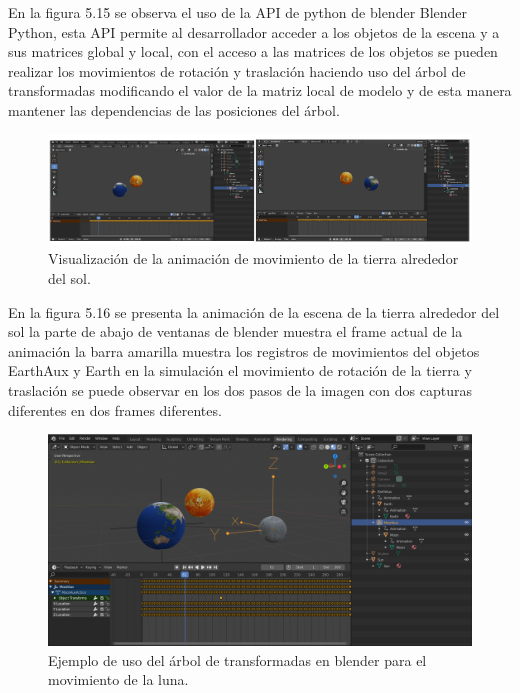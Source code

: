 \documentclass[a4paper, 17pt]{book}
\begin{document}
En la figura 5.15 se observa el uso de la API de python de blender Blender Python, esta API permite al desarrollador acceder a los objetos de la
escena y a sus matrices global y local, con el acceso a las matrices de los objetos se pueden realizar los movimientos de rotación y
traslación haciendo uso del árbol de transformadas modificando el valor de la matriz local de modelo y de esta manera mantener las
dependencias de las posiciones del árbol.

\begin{figure}[hbt!]
    \centering
    \includegraphics[scale=0.45, keepaspectratio]{img/AnimationBlender.png}
    \caption{Visualización de la animación de movimiento de la tierra alrededor del sol.}
    \label{figura:materialesBlender}
\end{figure}
\pagebreak

En la figura 5.16 se presenta la animación de la escena de la tierra alrededor del sol la parte de abajo de ventanas de blender
muestra el frame actual de la animación la barra amarilla muestra los registros de movimientos del objetos EarthAux y Earth en
la simulación el movimiento de rotación de la tierra y traslación se puede observar en los dos pasos de la imagen con dos
capturas diferentes en dos frames diferentes.

\begin{figure}[hbt!]
    \centering
    \includegraphics[scale=0.25, keepaspectratio]{img/MoonAux.png}
    \caption{Ejemplo de uso del árbol de transformadas en blender para el movimiento de la luna.}
    \label{figura:materialesBlender}
\end{figure}
\end{document}
